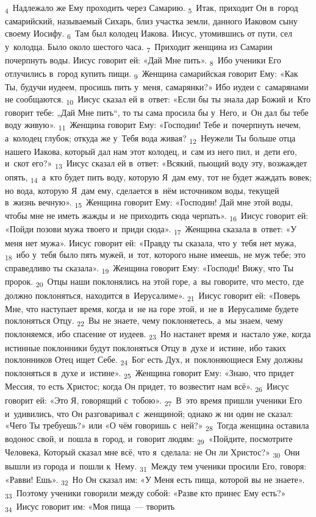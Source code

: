 \documentclass[a4paper,12pt]{article}
\begin{document}
\textsubscript{4}~Надлежало же Ему проходить через Самарию. \textsubscript{5}~Итак, приходит Он в~город самарийский, называемый Сихарь, близ участка земли, данного Иаковом сыну своему Иосифу. \textsubscript{6}~Там был колодец Иакова. Иисус, утомившись от пути, сел у~колодца. Было около шестого часа. \textsubscript{7}~Приходит женщина из Самарии почерпнуть воды. Иисус говорит ей: «Дай Мне пить». \textsubscript{8}~Ибо ученики Его отлучились в~город купить пищи. \textsubscript{9}~Женщина самарийская говорит Ему: «Как Ты, будучи иудеем, просишь пить у~меня, самарянки?» Ибо иудеи с~самарянами не сообщаются. \textsubscript{10}~Иисус сказал ей в~ответ: «Если бы ты знала дар Божий и~Кто говорит тебе: „Дай Мне пить“, то ты сама просила бы у~Него, и~Он дал бы тебе воду живую». \textsubscript{11}~Женщина говорит Ему: «Господин! Тебе и~почерпнуть нечем, а~колодец глубок; откуда же у~Тебя вода живая? \textsubscript{12}~Неужели Ты больше отца нашего Иакова, который дал нам этот колодец, и~сам из него пил, и~дети его, и~скот его?» \textsubscript{13}~Иисус сказал ей в~ответ: «Всякий, пьющий воду эту, возжаждет опять, \textsubscript{14}~а~кто будет пить воду, которую Я~дам ему, тот не будет жаждать вовек; но вода, которую Я~дам ему, сделается в~нём источником воды, текущей в~жизнь вечную». \textsubscript{15}~Женщина говорит Ему: «Господин! Дай мне этой воды, чтобы мне не иметь жажды и~не приходить сюда черпать». \textsubscript{16}~Иисус говорит ей: «Пойди позови мужа твоего и~приди сюда». \textsubscript{17}~Женщина сказала в~ответ: «У меня нет мужа». Иисус говорит ей: «Правду ты сказала, что у~тебя нет мужа, \textsubscript{18}~ибо у~тебя было пять мужей, и~тот, которого ныне имеешь, не муж тебе; это справедливо ты сказала». \textsubscript{19}~Женщина говорит Ему: «Господи! Вижу, что Ты пророк. \textsubscript{20}~Отцы наши поклонялись на этой горе, а~вы говорите, что место, где должно поклоняться, находится в~Иерусалиме». \textsubscript{21}~Иисус говорит ей: «Поверь Мне, что наступает время, когда и~не на горе этой, и~не в~Иерусалиме будете поклоняться Отцу. \textsubscript{22}~Вы не знаете, чему поклоняетесь, а~мы знаем, чему поклоняемся, ибо спасение от иудеев. \textsubscript{23}~Но настанет время и~настало уже, когда истинные поклонники будут поклоняться Отцу в~духе и~истине, ибо таких поклонников Отец ищет Себе. \textsubscript{24}~Бог есть Дух, и~поклоняющиеся Ему должны поклоняться в~духе и~истине». \textsubscript{25}~Женщина говорит Ему: «Знаю, что придет Мессия, то есть Христос; когда Он придет, то возвестит нам всё». \textsubscript{26}~Иисус говорит ей: «Это Я, говорящий с~тобою». \textsubscript{27}~В~это время пришли ученики Его и~удивились, что Он разговаривал с~женщиной; однако ж ни один не сказал: «Чего Ты требуешь?» или «О чём говоришь с~ней?» \textsubscript{28}~Тогда женщина оставила водонос свой, и~пошла в~город, и~говорит людям: \textsubscript{29}~«Пойдите, посмотрите Человека, Который сказал мне всё, что я~сделала: не Он ли Христос?» \textsubscript{30}~Они вышли из города и~пошли к~Нему. \textsubscript{31}~Между тем ученики просили Его, говоря: «Равви! Ешь». \textsubscript{32}~Но Он сказал им: «У Меня есть пища, которой вы не знаете». \textsubscript{33}~Поэтому ученики говорили между собой: «Разве кто принес Ему есть?» \textsubscript{34}~Иисус говорит им: «Моя пища~--- творить 
\end{document}
